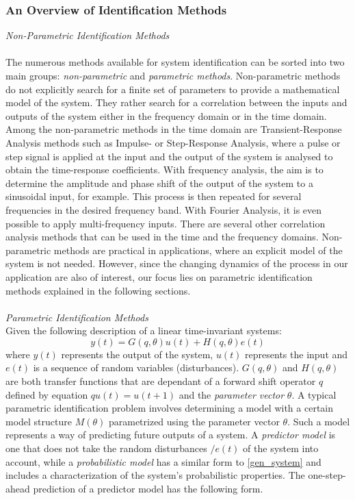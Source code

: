 \documentclass[9pt, twoside]{article}
\begin{document}
\begin{multicols}{2}
 \subsubsection{An Overview of Identification Methods}
\textit{Non-Parametric Identification Methods}\\
\\
 The numerous methods available for system identification can be sorted into two main groups: \textit{non-parametric} and \textit{parametric methods}. Non-parametric methods do not explicitly search for a finite set of parameters to provide a mathematical model of the system. They rather search for a correlation between the inputs and outputs of the system either in the frequency domain or in the time domain. Among the non-parametric methods in the time domain are Transient-Response Analysis methods such as Impulse- or Step-Response Analysis, where a pulse or step signal is applied at the input and the output of the system is analysed to obtain the time-response coefficients. With frequency analysis, the aim is to determine the amplitude and phase shift of the output of the system to a sinusoidal input, for example. This process is then repeated for several frequencies in the desired frequency band. With Fourier Analysis, it is even possible to apply multi-frequency inputs. There are several other correlation analysis methods that can be used in the time and the frequency domains. Non-parametric methods are practical in applications, where an explicit model of the system is not needed. However, since the changing dynamics of the process in our application are also of interest, our focus lies on parametric identification methods explained in the following sections.\\
 \\
 \textit{Parametric Identification Methods}\\[10pt]
 Given the following description of a linear time-invariant systems:\\
 \begin{equation}
 \label{gen_system}
 y(t)=G(q,\theta)u(t)+H(q,\theta)e(t)
 \end{equation}
 where $y(t)$ represents the output of the system, $u(t)$ represents the input and $e(t)$ is a sequence of random variables (disturbances). $G(q,\theta)$ and $H(q,\theta)$ are both transfer functions that are dependant of a forward shift operator $q$ defined by equation $qu(t)=u(t+1)$ and the \textit{parameter vector} $\theta$. A typical parametric identification problem involves determining a model with a certain model structure $M(\theta)$ parametrized using the parameter vector $\theta$. Such a model represents a way of predicting future outputs of a system. A \textit{predictor model} is one that does not take the random disturbances $/e(t)$ of the system into account, while a \textit{probabilistic model} has a similar form to \ref{gen_system} and includes a characterization of the system's probabilistic properties. The one-step-ahead prediction of a predictor model has the following form. 

\end{multicols}
\end{document}
